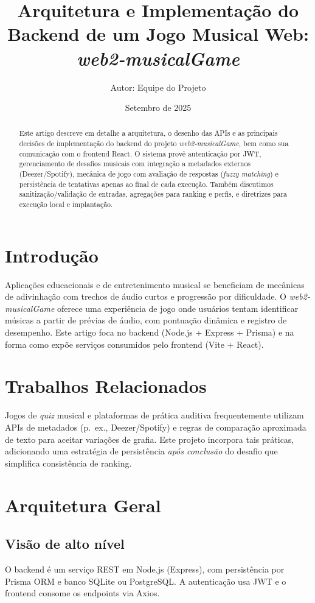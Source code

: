 \documentclass[12pt,a4paper]{article}
\title{Arquitetura e Implementação do Backend de um Jogo Musical Web: \textit{web2-musicalGame}}
\author{Autor: Equipe do Projeto}
\date{Setembro de 2025}
\begin{document}
\maketitle

\begin{abstract}
Este artigo descreve em detalhe a arquitetura, o desenho das APIs e as principais decisões de implementação do backend do projeto \textit{web2-musicalGame}, bem como sua comunicação com o frontend React. O sistema provê autenticação por JWT, gerenciamento de desafios musicais com integração a metadados externos (Deezer/Spotify), mecânica de jogo com avaliação de respostas (\textit{fuzzy matching}) e persistência de tentativas apenas ao final de cada execução. Também discutimos sanitização/validação de entradas, agregações para ranking e perfis, e diretrizes para execução local e implantação.
\end{abstract}

\section{Introdução}
Aplicações educacionais e de entretenimento musical se beneficiam de mecânicas de adivinhação com trechos de áudio curtos e progressão por dificuldade. O \textit{web2-musicalGame} oferece uma experiência de jogo onde usuários tentam identificar músicas a partir de prévias de áudio, com pontuação dinâmica e registro de desempenho. Este artigo foca no backend (Node.js + Express + Prisma) e na forma como expõe serviços consumidos pelo frontend (Vite + React).

\section{Trabalhos Relacionados}
Jogos de \textit{quiz} musical e plataformas de prática auditiva frequentemente utilizam APIs de metadados (p.~ex., Deezer/Spotify) e regras de comparação aproximada de texto para aceitar variações de grafia. Este projeto incorpora tais práticas, adicionando uma estratégia de persistência \textit{após conclusão} do desafio que simplifica consistência de ranking.

\section{Arquitetura Geral}
\subsection{Visão de alto nível}
O backend é um serviço REST em Node.js (Express), com persistência por Prisma ORM e banco SQLite ou PostgreSQL. A autenticação usa JWT e o frontend consome os endpoints via Axios.
\end{document}
